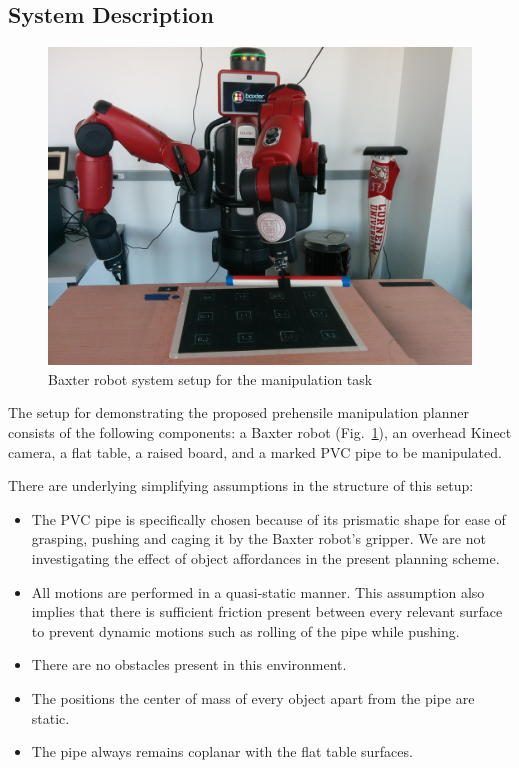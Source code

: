 \documentclass[runningheads,letterpaper]{llncs}
\begin{document}
\subsection{System Description}
\begin{figure}
\centering
	\includegraphics[width=0.9\columnwidth]{images/baxter.jpg}
\caption{Baxter robot system setup for the manipulation task}
\label{fig:system}
\end{figure}

The setup for demonstrating the proposed prehensile manipulation planner consists of the following components: a Baxter robot (Fig.~\ref{fig:system}), an overhead Kinect camera, a flat table, a raised board, and a marked PVC pipe to be manipulated.

There are underlying simplifying assumptions in the structure of this setup:
\begin{itemize}
\item
The PVC pipe is specifically chosen because of its prismatic shape for ease of grasping, pushing and caging it by the Baxter robot's gripper. We are not investigating the effect of object affordances in the present planning scheme. 
\item
All motions are performed in a quasi-static manner. This assumption also implies that there is sufficient friction present between every relevant surface to prevent dynamic motions such as rolling of the pipe while pushing. 
\item
There are no obstacles present in this environment.
\item
The positions the center of mass of every object apart from the pipe are static.
\item
The pipe always remains coplanar with the flat table surfaces. 
\end{itemize}
\end{document}
